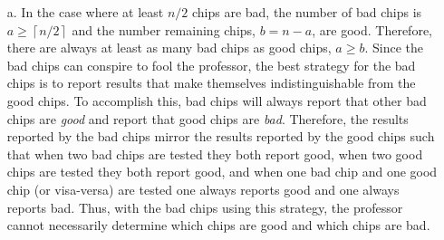 \documentclass[11pt]{article}
\theoremstyle{nonumberplain}
\begin{document}
\begin{enumerate}
\item[a.] In the case where at least $n/2$ chips are bad, the number of bad chips is $a \geq \left \lceil{n/2} \right \rceil$ and the number remaining chips, $b=n-a$, are good. Therefore, there are always at least as many bad chips as good chips, $a \geq b$. %
Since the bad chips can conspire to fool the professor, the best strategy for the bad chips is to report results that make themselves indistinguishable from the good chips. To accomplish this, bad chips will always report that other bad chips are \emph{good} and report that good chips are \emph{bad}. Therefore, the results reported by the bad chips mirror the results reported by the good chips such that when two bad chips are tested they both report good, when two good chips are tested they both report good, and when one bad chip and one good chip (or visa-versa)  are tested one always reports good and one always reports bad. Thus, with the bad chips using this strategy, the professor cannot necessarily determine which chips are good and which chips are bad.


\end{enumerate}
\end{document}
